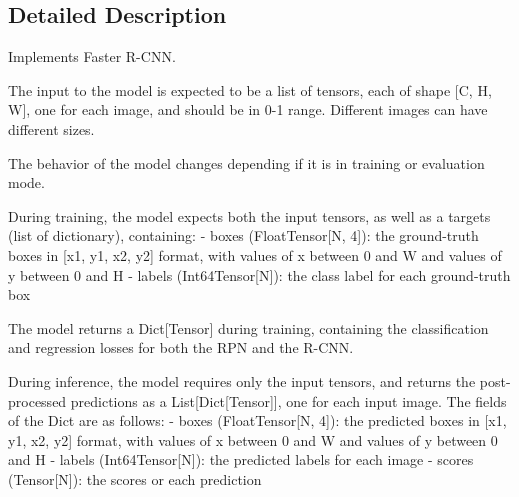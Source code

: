 \subsection{Detailed Description}
\begin{DoxyVerb}Implements Faster R-CNN.

The input to the model is expected to be a list of tensors, each of shape [C, H, W], one for each
image, and should be in 0-1 range. Different images can have different sizes.

The behavior of the model changes depending if it is in training or evaluation mode.

During training, the model expects both the input tensors, as well as a targets (list of dictionary),
containing:
    - boxes (FloatTensor[N, 4]): the ground-truth boxes in [x1, y1, x2, y2] format, with values of x
      between 0 and W and values of y between 0 and H
    - labels (Int64Tensor[N]): the class label for each ground-truth box

The model returns a Dict[Tensor] during training, containing the classification and regression
losses for both the RPN and the R-CNN.

During inference, the model requires only the input tensors, and returns the post-processed
predictions as a List[Dict[Tensor]], one for each input image. The fields of the Dict are as
follows:
    - boxes (FloatTensor[N, 4]): the predicted boxes in [x1, y1, x2, y2] format, with values of x
      between 0 and W and values of y between 0 and H
    - labels (Int64Tensor[N]): the predicted labels for each image
    - scores (Tensor[N]): the scores or each prediction


\end{DoxyVerb}
